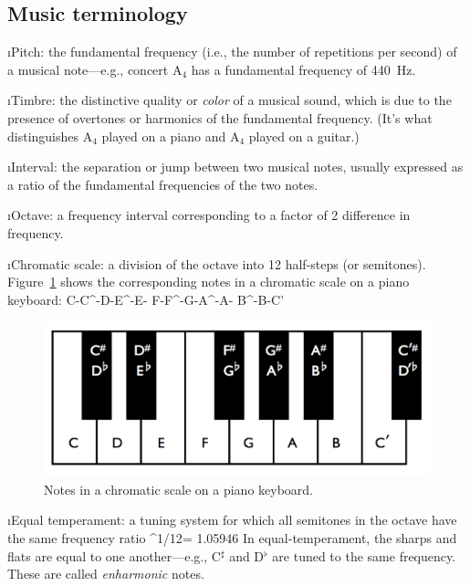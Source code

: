 \subsection{Music terminology}

\bi

\i Pitch: the fundamental frequency (i.e., the number 
of repetitions per second) of a musical note---e.g.,
concert A$_4$ has a fundamental frequency of 440~Hz.

\i Timbre: the distinctive quality or {\em color} of a
musical sound, which is due to the presence of overtones
or harmonics of the fundamental frequency.
(It's what distinguishes A$_4$ played on a piano and
A$_4$ played on a guitar.)

\i Interval: the separation or jump between two musical
notes, usually expressed as a ratio of the fundamental 
frequencies of the two notes.

\i Octave: a frequency interval corresponding to a factor 
of 2 difference in frequency.

\i Chromatic scale: a division of the octave into 12 
half-steps (or semitones).
Figure~\ref{f:chromatic-scale-keyboard} shows the
corresponding notes in a chromatic scale on 
a piano keyboard:
%
\be
{\rm C}-{\rm C}^\sharp-{\rm D}-{\rm E}^\flat-{\rm E}-%
{\rm F}-{\rm F}^\sharp-{\rm G}-{\rm A}^\flat-{\rm A}-%
{\rm B}^\flat-{\rm B}-{\rm C}'
\nonumber
\ee
%
\begin{figure}[htbp]
\begin{center}
\includegraphics[width=.7\textwidth]{octave-keys}
\caption{Notes in a chromatic scale on a piano keyboard.}
\label{f:chromatic-scale-keyboard}
\end{center}
\end{figure}
%

\i Equal temperament: a tuning system for which all 
semitones in the octave have the same frequency ratio 
%
^{1/12}= 1.05946
\ee
In equal-temperament, the sharps and flats are equal
to one another---e.g., C${}^\sharp$ and D${}^\flat$
are tuned to the same frequency.
These are called {\em enharmonic} notes.

